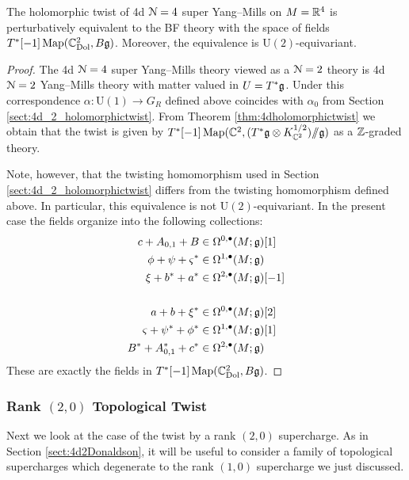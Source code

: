 \documentclass[10pt, oneside]{article}
\renewcommand{\U}{\mathrm{U}}
\newcommand{\ham}{/\!\!/}
\begin{document}
\begin{theorem}
The holomorphic twist of 4d $\mathcal N=4$ super Yang--Mills on $M=\mathbb R^4$ is perturbatively equivalent to the BF theory with the space of fields $T^*[-1] \operatorname{Map}(\mathbb C^2_{\rm Dol} , B \mathfrak g)$. Moreover, the equivalence is $\U(2)$-equivariant.
\label{thm:4d4holomorphictwist}
\end{theorem}
\begin{proof}
The 4d $\mathcal N=4$ super Yang--Mills theory viewed as a $\mathcal N=2$ theory is 4d $\mathcal N=2$ Yang--Mills theory with matter valued in $U=T^*\mathfrak g$. Under this correspondence $\alpha\colon \U(1)\rightarrow G_R$ defined above coincides with $\alpha_0$ from Section \ref{sect:4d_2_holomorphictwist}. From Theorem \ref{thm:4dholomorphictwist} we obtain that the twist is given by $T^*[-1] \map(\CC^2 , (T^*\fg\otimes K_{\CC^2}^{1/2})\ham \fg)$ as a $\mathbb Z$-graded theory.

Note, however, that the twisting homomorphism used in Section \ref{sect:4d_2_holomorphictwist} differs from the twisting homomorphism defined above. In particular, this equivalence is not $\U(2)$-equivariant. In the present case the fields organize into the following collections:
\begin{align*}
c+A_{0, 1}+B&\in\Omega^{0, \bullet}(M; \mathfrak g)[1] \\
\phi + \psi + \varsigma^*&\in\Omega^{1, \bullet}(M; \mathfrak g) \\
\xi + b^* + a^*&\in\Omega^{2, \bullet}(M; \mathfrak g)[-1] \\
\\
a + b + \xi^*&\in\Omega^{0, \bullet}(M; \mathfrak g)[2] \\
\varsigma + \psi^* + \phi^* &\in\Omega^{1, \bullet}(M; \mathfrak g)[1] \\
B^*+A^*_{0, 1}+ c^*&\in\Omega^{2, \bullet}(M; \mathfrak g)
\end{align*}
These are exactly the fields in $T^*[-1] \operatorname{Map}(\mathbb C^2_{\rm Dol} , B \mathfrak g)$.
\end{proof}

\subsubsection{Rank \texorpdfstring{$(2,0)$}{(2,0)} Topological Twist}
\label{sect:4d4Atwist}

Next we look at the case of the twist by a rank $(2,0)$ supercharge. 
As in Section \ref{sect:4d2Donaldson}, it will be useful to consider a family of topological supercharges which degenerate to the rank $(1,0)$ supercharge we just discussed. 
\end{document}
